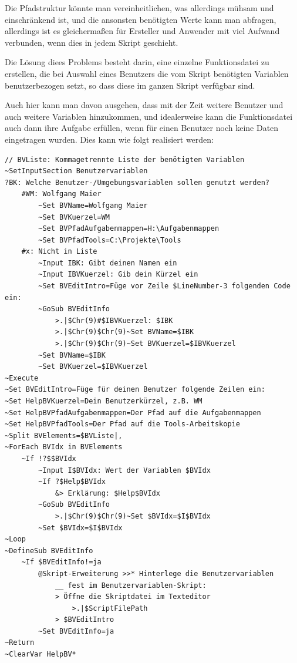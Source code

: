 Die Pfadstruktur könnte man vereinheitlichen, was allerdings mühsam und einschränkend ist, und die ansonsten benötigten Werte kann man abfragen, allerdings ist es gleichermaßen für Ersteller und Anwender mit viel Aufwand verbunden, wenn dies in jedem Skript geschieht.

Die Lösung diees Problems besteht darin, eine einzelne Funktionsdatei zu erstellen, die bei Auswahl eines Benutzers die vom Skript benötigten Variablen benutzerbezogen setzt, so dass diese im ganzen Skript verfügbar sind. 

Auch hier kann man davon ausgehen, dass mit der Zeit weitere Benutzer und auch weitere Variablen hinzukommen, und idealerweise kann die Funktionsdatei auch dann ihre Aufgabe erfüllen, wenn für einen Benutzer noch keine Daten eingetragen wurden. Dies kann wie folgt realisiert werden:

\label{BspBenutzervariablen}
\begin{verbatim}
// BVListe: Kommagetrennte Liste der benötigten Variablen
~SetInputSection Benutzervariablen
?BK: Welche Benutzer-/Umgebungsvariablen sollen genutzt werden?
    #WM: Wolfgang Maier
        ~Set BVName=Wolfgang Maier
        ~Set BVKuerzel=WM
        ~Set BVPfadAufgabenmappen=H:\Aufgabenmappen
        ~Set BVPfadTools=C:\Projekte\Tools
    #x: Nicht in Liste
        ~Input IBK: Gibt deinen Namen ein
        ~Input IBVKuerzel: Gib dein Kürzel ein        
        ~Set BVEditIntro=Füge vor Zeile $LineNumber-3 folgenden Code ein:            
        ~GoSub BVEditInfo
            >.|$Chr(9)#$IBVKuerzel: $IBK
            >.|$Chr(9)$Chr(9)~Set BVName=$IBK
            >.|$Chr(9)$Chr(9)~Set BVKuerzel=$IBVKuerzel
        ~Set BVName=$IBK
        ~Set BVKuerzel=$IBVKuerzel
~Execute
~Set BVEditIntro=Füge für deinen Benutzer folgende Zeilen ein:
~Set HelpBVKuerzel=Dein Benutzerkürzel, z.B. WM
~Set HelpBVPfadAufgabenmappen=Der Pfad auf die Aufgabenmappen
~Set HelpBVPfadTools=Der Pfad auf die Tools-Arbeitskopie
~Split BVElements=$BVListe|,
~ForEach BVIdx in BVElements
    ~If !?$$BVIdx
        ~Input I$BVIdx: Wert der Variablen $BVIdx
        ~If ?$Help$BVIdx
            &> Erklärung: $Help$BVIdx
        ~GoSub BVEditInfo
            >.|$Chr(9)$Chr(9)~Set $BVIdx=$I$BVIdx
        ~Set $BVIdx=$I$BVIdx        
~Loop
~DefineSub BVEditInfo
    ~If $BVEditInfo!=ja
        @Skript-Erweiterung >>* Hinterlege die Benutzervariablen
            __ fest im Benutzervariablen-Skript:
            > Öffne die Skriptdatei im Texteditor
                >.|$ScriptFilePath
            > $BVEditIntro
        ~Set BVEditInfo=ja
~Return
~ClearVar HelpBV*
\end{verbatim}

